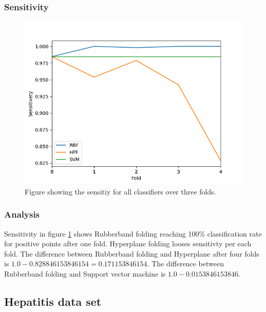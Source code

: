 \documentclass[a4paper,twoside]{bth}
\begin{document}
\subsubsection{Sensitivity}
\begin{figure}[!htb]
\centering
\includegraphics[scale=0.7]{images/result-bmi/Sensitivety.png}
   \caption{Figure showing the sensitiy for all classifiers over three folds.}
   \label{fig:bmi-Sensitivity}
\end{figure}

\FloatBarrier

\subsubsection{Analysis}
Sensitivity in figure \ref{fig:bmi-Sensitivity} shows Rubberband folding reaching 100\% classification rate for positive points after one fold. Hyperplane folding looses sensitivty per each fold. The difference between Rubberband folding and Hyperplane after four folds is $1.0 - 0.828846153846154 = 0.171153846154$. The difference between Rubberband folding and Support vector machine is $1.0 - 0.0153846153846$.

\clearpage

\subsection{Hepatitis data set}

\FloatBarrier
\end{document}
